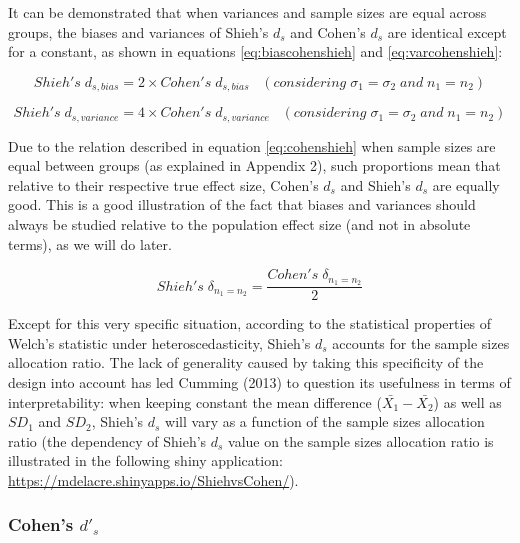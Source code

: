 \documentclass[
  man,floatsintext]{apa6}
\begin{document}
It can be demonstrated that when variances and sample sizes are equal across groups, the biases and variances of Shieh's \(d_s\) and Cohen's \(d_s\) are identical except for a constant, as shown in equations \ref{eq:biascohenshieh} and \ref{eq:varcohenshieh}:

\begin{equation} 
Shieh's \; d_{s,bias} = 2 \times Cohen's \; d_{s,bias} \;\;\;(considering \; \sigma_1 = \sigma_2 \; and \; n_1 = n_2)
\label{eq:biascohenshieh}
\end{equation}

\begin{equation} 
Shieh's \; d_{s,variance} = 4 \times Cohen's \; d_{s,variance} \;\;\;(considering \; \sigma_1 = \sigma_2 \; and \; n_1 = n_2)
\label{eq:varcohenshieh}
\end{equation}

Due to the relation described in equation \ref{eq:cohenshieh} when sample sizes are equal between groups (as explained in Appendix 2), such proportions mean that relative to their respective true effect size, Cohen's \(d_s\) and Shieh's \(d_s\) are equally good. This is a good illustration of the fact that biases and variances should always be studied relative to the population effect size (and not in absolute terms), as we will do later.

\begin{equation} 
Shieh's \; \delta_{n_1=n_2}= \frac{Cohen's \; \delta_{n_1=n_2}}{2}
\label{eq:cohenshieh}
\end{equation}

Except for this very specific situation, according to the statistical properties of Welch's statistic under heteroscedasticity, Shieh's \(d_s\) accounts for the sample sizes allocation ratio. The lack of generality caused by taking this specificity of the design into account has led Cumming (2013) to question its usefulness in terms of interpretability: when keeping constant the mean difference (\(\bar{X_1}-\bar{X_2}\)) as well as \(SD_1\) and \(SD_2\), Shieh's \(d_s\) will vary as a function of the sample sizes allocation ratio (the dependency of Shieh's \(d_s\) value on the sample sizes allocation ratio is illustrated in the following shiny application: \url{https://mdelacre.shinyapps.io/ShiehvsCohen/}).

\hypertarget{cohens-d_s}{%
\subsubsection{\texorpdfstring{Cohen's \(d'_s\)}{Cohen's d'\_s}}\label{cohens-d_s}}
\end{document}
